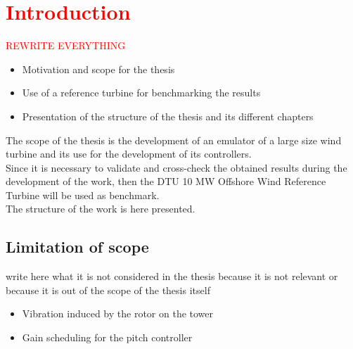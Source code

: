 \newpage
\section{\textcolor{red}{Introduction}}

\textcolor{red}{REWRITE EVERYTHING}
\begin{itemize}
    \item Motivation and scope for the thesis
    \item Use of a reference turbine for benchmarking the results
    \item Presentation of the structure of the thesis and its different chapters
\end{itemize}


The scope of the thesis is the development of an emulator of a large size wind turbine and its use for the development of its controllers.\\

Since it is necessary to validate and cross-check the obtained results during the development of the work, then the DTU 10 MW Offshore Wind Reference Turbine will be used as benchmark.\\

The structure of the work is here presented.\\

\subsection{Limitation of scope}\label{sec:limitation_of_scope}
write here what it is not considered in the thesis because it is not relevant or because it is out of the scope of the thesis itself
\begin{itemize}
    \item Vibration induced by the rotor on the tower
    \item Gain scheduling for the pitch controller
\end{itemize}